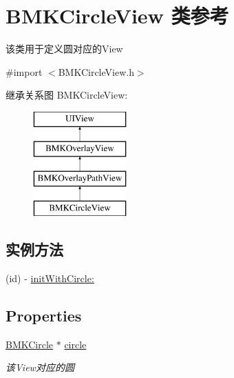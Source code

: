 \hypertarget{interface_b_m_k_circle_view}{\section{B\-M\-K\-Circle\-View 类参考}
\label{interface_b_m_k_circle_view}
}


该类用于定义圆对应的\-View  




{\ttfamily \#import $<$B\-M\-K\-Circle\-View.\-h$>$}

继承关系图 B\-M\-K\-Circle\-View\-:\begin{figure}[H]
\begin{center}
\leavevmode
\includegraphics[height=4.000000cm]{interface_b_m_k_circle_view}
\end{center}
\end{figure}
\subsection*{实例方法}
\begin{DoxyCompactItemize}
\item 
(id) -\/ \hyperlink{interface_b_m_k_circle_view_a35f06526cf5423a39d434edc0517d34e}{init\-With\-Circle\-:}
\end{DoxyCompactItemize}
\subsection*{Properties}
\begin{DoxyCompactItemize}
\item 
\hypertarget{interface_b_m_k_circle_view_a07fe8c131d40bb225849dbc9bfb17e18}{\hyperlink{interface_b_m_k_circle}{B\-M\-K\-Circle} $\ast$ \hyperlink{interface_b_m_k_circle_view_a07fe8c131d40bb225849dbc9bfb17e18}{circle}}\label{interface_b_m_k_circle_view_a07fe8c131d40bb225849dbc9bfb17e18}

\begin{DoxyCompactList}\small\item\em 该\-View对应的圆 \end{DoxyCompactList}\end{DoxyCompactItemize}
